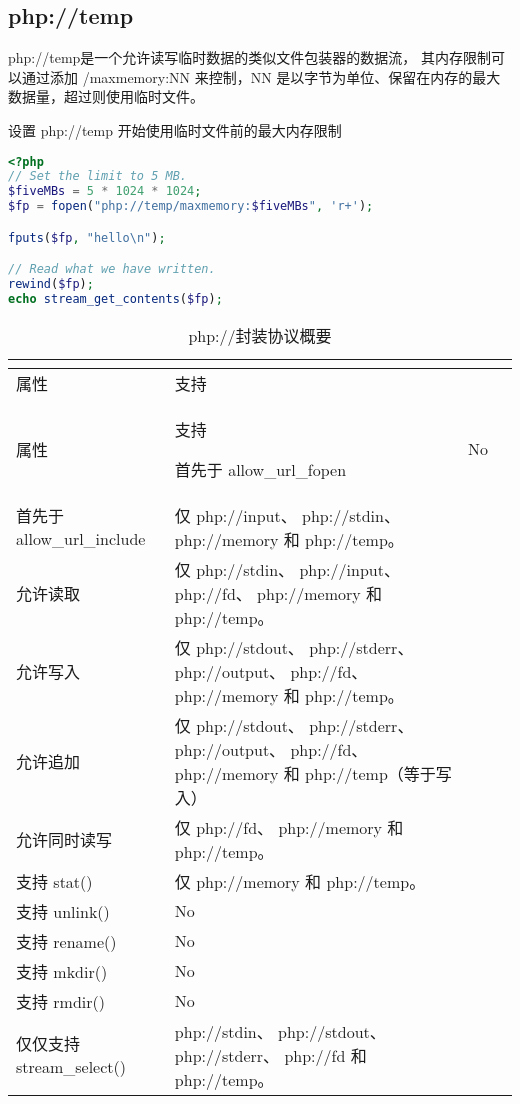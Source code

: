 \subsection{php://temp}

php://temp是一个允许读写临时数据的类似文件包装器的数据流， 其内存限制可以通过添加 /maxmemory:NN 来控制，NN 是以字节为单位、保留在内存的最大数据量，超过则使用临时文件。


\begin{example}
设置 php://temp 开始使用临时文件前的最大内存限制
\begin{lstlisting}[language=PHP]
<?php
// Set the limit to 5 MB.
$fiveMBs = 5 * 1024 * 1024;
$fp = fopen("php://temp/maxmemory:$fiveMBs", 'r+');

fputs($fp, "hello\n");

// Read what we have written.
rewind($fp);
echo stream_get_contents($fp);
\end{lstlisting}
\end{example}

\begin{longtable}{|m{100pt}|m{150pt}|}
\tabularnewline\hline
属性&支持
\endhead

\caption{php://封装协议概要}\\
\hline
属性&支持
\endfirsthead

\endfoot

\endlastfoot
\hline
首先于 allow\_url\_fopen	&No\\
\hline
首先于 allow\_url\_include	&仅 php://input、 php://stdin、 php://memory 和 php://temp。\\
\hline
允许读取	&仅 php://stdin、 php://input、 php://fd、 php://memory 和 php://temp。\\
\hline
允许写入	&仅 php://stdout、 php://stderr、 php://output、 php://fd、 php://memory 和 php://temp。\\
\hline
允许追加	&仅 php://stdout、 php://stderr、 php://output、 php://fd、 php://memory 和 php://temp（等于写入）\\
\hline
允许同时读写	&仅 php://fd、 php://memory 和 php://temp。\\
\hline
支持 stat()	&仅 php://memory 和 php://temp。\\
\hline
支持 unlink()	&No\\
\hline
支持 rename()	&No\\
\hline
支持 mkdir()	&No\\
\hline
支持 rmdir()	&No\\
\hline
仅仅支持 stream\_select()&php://stdin、 php://stdout、 php://stderr、 php://fd 和 php://temp。\\
\hline
\end{longtable}

